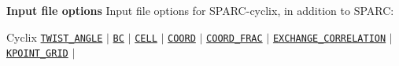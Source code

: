 \begin{frame}[allowframebreaks]{\textbf{Input file options}} \label{Index}
\vspace{-2mm}
Input file options for SPARC-cyclix, in addition to SPARC:
 \begin{block}{Cyclix}
\hyperlink{TWIST_ANGLE}{\texttt{TWIST\_ANGLE}} $\vert$ 
\hyperlink{BC}{\texttt{BC}} $\vert$ 
\hyperlink{CELL}{\texttt{CELL}}  $\vert$ 
\hyperlink{COORD}{\texttt{COORD}}  $\vert$ 
\hyperlink{COORD_FRAC}{\texttt{COORD\_FRAC}}  $\vert$ 
\hyperlink{EXCHANGE_CORRELATION}{\texttt{EXCHANGE\_CORRELATION}} $\vert$ 
\hyperlink{KPOINT_GRID}{\texttt{KPOINT\_GRID}} $\vert$ 

\end{block}
\end{frame}









